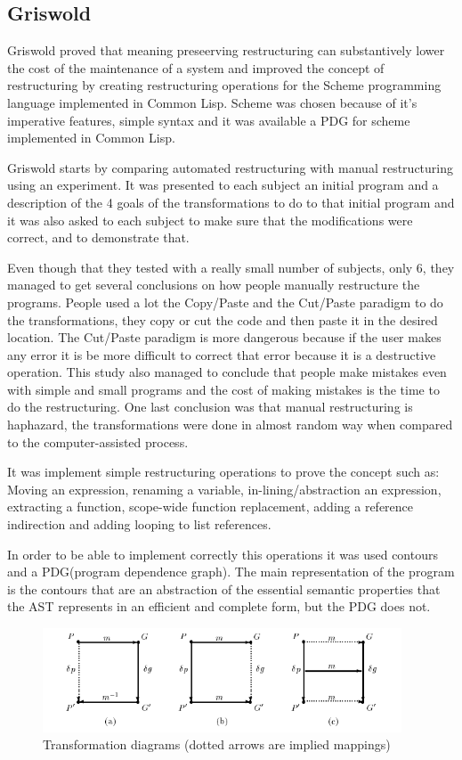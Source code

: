 \subsection{Griswold}
Griswold \cite{griswold1991program} proved that meaning preseerving restructuring can substantively lower the cost of the maintenance of a system and improved the concept of restructuring by creating restructuring operations for the Scheme programming language implemented in Common Lisp. Scheme was chosen because of it's imperative features, simple syntax and it was available a PDG for scheme implemented in Common Lisp.


Griswold starts by comparing automated restructuring with manual restructuring using an experiment. It was presented to each subject an initial program and a description of the 4 goals of the transformations to do to that initial program and it was also asked to each subject to make sure that the modifications were correct, and to demonstrate that. 

Even though that they tested with a really small number of subjects, only 6, they managed to get several conclusions on how people manually restructure the programs.
People used a lot the Copy/Paste and the Cut/Paste paradigm to do the transformations, they copy or cut the code and then paste it in the desired location.
The Cut/Paste paradigm is more dangerous because if the user makes any error it is be more difficult to correct that error because it is a destructive operation.
This study also managed to conclude that people make mistakes even with simple and small programs and the cost of making mistakes is the time to do the restructuring.
One last conclusion was that manual restructuring is haphazard, the transformations were done in almost random way when compared to the computer-assisted process.


It was implement simple restructuring operations to prove the concept such as: Moving an expression, renaming a variable, in-lining/abstraction an expression, extracting a function, scope-wide function replacement, adding a reference indirection and adding looping to list references.


In order to be able to implement correctly this operations it was used contours and a PDG(program dependence graph). The main representation of the program is the contours that are an abstraction of the essential semantic properties that the AST represents in an efficient and complete form, but the PDG does not.
\begin{figure}[htbp]
  \centering
  \includegraphics[width=0.95\textwidth]{img/Griswold1.png}
  \caption{Transformation diagrams (dotted arrows are implied mappings)}
  \label{fig:Griswold}
\end{figure}

